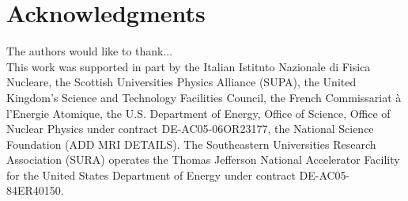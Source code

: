 \section*{Acknowledgments}
The authors would like to thank...\\

This work was supported in part by the Italian Istituto Nazionale di Fisica Nucleare, the Scottish Universities Physics Alliance (SUPA), the United Kingdom's Science and Technology Facilities Council, the French Commissariat \`{a} l'Energie Atomique, the U.S. Department of Energy, Office of Science, Office of Nuclear Physics under contract DE-AC05-06OR23177, the National Science Foundation (ADD MRI DETAILS). The Southeastern Universities Research Association (SURA) operates the
 Thomas Jefferson National Accelerator Facility for the United States
 Department of Energy under contract DE-AC05-84ER40150.